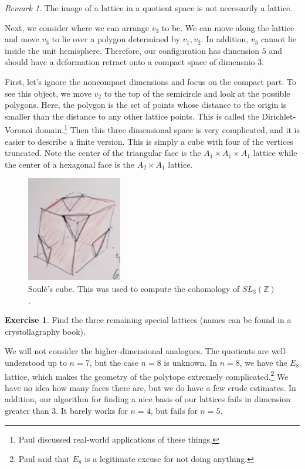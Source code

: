 \documentclass[leqno, openany]{memoir}
\theoremstyle{definition}
\newtheorem{exer}[thm]{Exercise}
\theoremstyle{remark}
\newtheorem{rmk}[thm]{Remark}
\theoremstyle{plain}
\theoremstyle{definition}
\theoremstyle{remark}
\newcommand{\Z}{\mathbb{Z}}
\begin{document}
\begin{rmk}
    The image of a lattice in a quotient space is not necessarily a lattice.
\end{rmk}

Next, we consider where we can arrange $v_3$ to be. We can move along the lattice and move $v_3$ to lie over a polygon determined by $v_1,v_2$. In addition, $v_3$ cannot lie inside the unit hemisphere. Therefore, our configuration has dimension $5$ and should have a deformation retract onto a compact space of dimensnio $3$.

First, let's ignore the noncompact dimensions and focus on the compact part. To see this object, we move $v_2$ to the top of the semicircle and look at the possible polygons. Here, the polygon is the set of points whose distance to the origin is smaller than the distance to any other lattice points. This is called the Dirichlet-Voronoi domain.\footnote{Paul discussed real-world applications of these things.} Then this three dimensional space is very complicated, and it is easier to describe a finite version. This is simply a cube with four of the vertices truncated. Note the center of the triangular face is the $A_1 \times A_1 \times A_1$ lattice while the center of a hexagonal face is the $A_2 \times A_1$ lattice.

\begin{figure}[H]
    \centering
    \includegraphics[scale=0.5]{voronoi.png}
    \caption{Soul\'e's cube. This was used to compute the cohomology of $SL_3(\Z)$.}%
    \label{fig:name}
\end{figure}

\begin{exer}
    Find the three remaining special lattices (names can be found in a crystollagraphy book).
\end{exer}

We will not consider the higher-dimensional analogues. The quotients are well-understood up to $n=7$, but the case $n=8$ is unknown. In $n=8$, we have the $E_8$ lattice, which makes the geometry of the polytope extremely complicated.\footnote{Paul said that $E_8$ is a legitimate excuse for not doing anything.} We have no idea how many faces there are, but we do have a few crude estimates. In addition, our algorithm for finding a nice basis of our lattices fails in dimension greater than $3$. It barely works for $n=4$, but fails for $n=5$.
\end{document}
